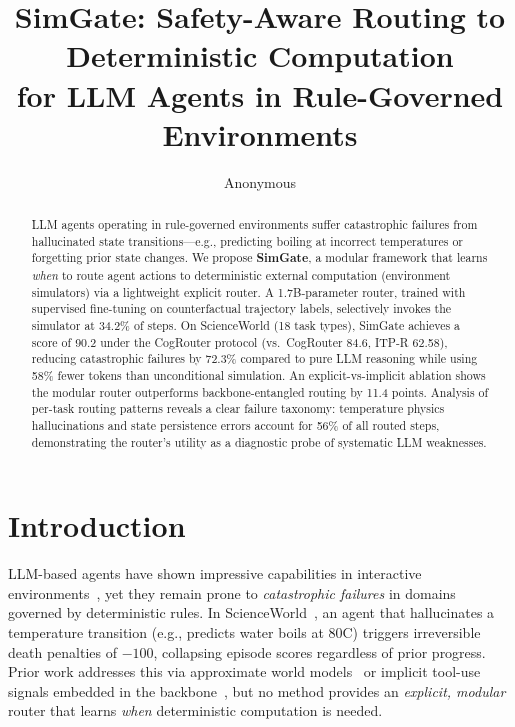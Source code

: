 \documentclass[11pt,a4paper]{article}
\title{SimGate: Safety-Aware Routing to Deterministic Computation\\for LLM Agents in Rule-Governed Environments}
\author{Anonymous}
\begin{document}
\maketitle

\begin{abstract}
LLM agents operating in rule-governed environments suffer catastrophic failures from hallucinated state transitions---e.g., predicting boiling at incorrect temperatures or forgetting prior state changes.
We propose \textbf{SimGate}, a modular framework that learns \emph{when} to route agent actions to deterministic external computation (environment simulators) via a lightweight explicit router.
A 1.7B-parameter router, trained with supervised fine-tuning on counterfactual trajectory labels, selectively invokes the simulator at 34.2\% of steps.
On ScienceWorld (18 task types), SimGate achieves a score of 90.2 under the CogRouter protocol (vs.\ CogRouter 84.6, ITP-R 62.58), reducing catastrophic failures by 72.3\% compared to pure LLM reasoning while using 58\% fewer tokens than unconditional simulation.
An explicit-vs-implicit ablation shows the modular router outperforms backbone-entangled routing by 11.4 points.
Analysis of per-task routing patterns reveals a clear failure taxonomy: temperature physics hallucinations and state persistence errors account for 56\% of all routed steps, demonstrating the router's utility as a diagnostic probe of systematic LLM weaknesses.
\end{abstract}

\section{Introduction}

LLM-based agents have shown impressive capabilities in interactive environments~\cite{yao2023react,shinn2023reflexion}, yet they remain prone to \emph{catastrophic failures} in domains governed by deterministic rules.
In ScienceWorld~\cite{wang2022scienceworld}, an agent that hallucinates a temperature transition (e.g., predicts water boils at 80\textdegree{}C) triggers irreversible death penalties of $-100$, collapsing episode scores regardless of prior progress.
Prior work addresses this via approximate world models~\cite{hao2023reasoning} or implicit tool-use signals embedded in the backbone~\cite{gou2024tora}, but no method provides an \emph{explicit, modular} router that learns \emph{when} deterministic computation is needed.
\end{document}
